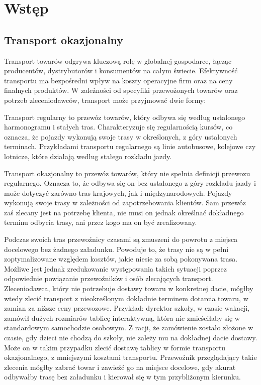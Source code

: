 \chapter{Wstęp}

\section{Transport okazjonalny}
Transport towarów odgrywa kluczową rolę w globalnej gospodarce, łącząc producentów, dystrybutorów i konsumentów na całym świecie. Efektywność transportu ma bezpośredni wpływ na koszty operacyjne firm oraz na ceny finalnych produktów. W zależności od specyfiki przewożonych towarów oraz potrzeb zleceniodawców, transport może przyjmować dwie formy:

\label{sec:przewoz_regularny}
Transport regularny to przewóz towarów, który odbywa się według ustalonego harmonogramu i stałych tras. Charakteryzuje się regularnością kursów, co oznacza, że pojazdy wykonują swoje trasy w określonych, z góry ustalonych terminach. Przykładami transportu regularnego są linie autobusowe, kolejowe czy lotnicze, które działają według stałego rozkładu jazdy.

\label{sec:transport_okazjonalny}
Transport okazjonalny to przewóz towarów, który nie spełnia definicji przewozu regularnego. Oznacza to, że odbywa się on bez ustalonego z góry rozkładu jazdy i może dotyczyć zarówno tras krajowych, jak i międzynarodowych. Pojazdy wykonują swoje trasy w zależności od zapotrzebowania klientów. Sam przewóz zaś zlecany jest na potrzebę klienta, nie musi on jednak określnać dokładnego terminu odbycia trasy, ani przez kogo ma on być zrealizowany.

Podczas swoich tras przewoźnicy czasami są zmuszeni do powrotu z miejsca docelowego bez żadnego załadunku. Powoduje to, że trasy nie są w pełni zoptymalizowane względem kosztów, jakie niesie za sobą pokonywana trasa. Możliwe jest jednak zredukowanie występowania takich sytuacji poprzez odpowiednie powiązanie przewoźników i osób zlecających transport. Zleceniodawca, który nie potrzebuje dostawy towaru w konkretnej dacie, mógłby wtedy zlecić transport z nieokreślonym dokładnie terminem dotarcia towaru, w zamian za niższe ceny przewozowe. Przykład: dyrektor szkoły, w czasie wakacji, zamówił dużych rozmiarów tablicę interaktywną, która nie zmieściłaby się w standardowym samochodzie osobowym. Z racji, że zamówienie zostało złożone w czasie, gdy dzieci nie chodzą do szkoły, nie zależy mu na dokładnej dacie dostawy. Może on w takim przypadku zlecić dostawę tablicy w formie transportu okazjonalnego, z mniejszymi kosztami transportu. Przewoźnik przeglądający takie zlecenia mógłby zabrać towar i zawieźć go na miejsce docelowe, gdy akurat odbywałby trasę bez załadunku i kierował się w tym przybliżonym kierunku.

